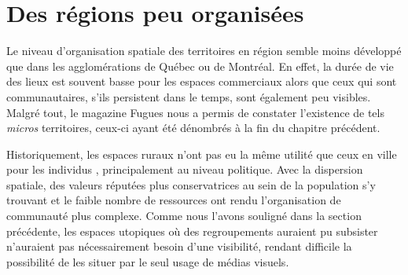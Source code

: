 \section{Des régions peu organisées}
\label{sec:des_regions_peu_organisees}
Le niveau d'organisation spatiale des territoires en région semble moins développé que dans les agglomérations de Québec ou de Montréal.
En effet, la durée de vie des lieux est souvent basse pour les espaces commerciaux alors que ceux qui sont communautaires, s'ils persistent dans le temps, sont également peu visibles.
Malgré tout, le magazine Fugues nous a permis de constater l'existence de tels \emph{micros} territoires, ceux-ci ayant été dénombrés à la fin du chapitre précédent.

Historiquement, les espaces ruraux n'ont pas eu la même utilité que ceux en ville pour les individus \lgbt{}, principalement au niveau politique.
Avec la dispersion spatiale, des valeurs réputées plus conservatrices au sein de la population s'y trouvant et le faible nombre de ressources ont rendu l'organisation de communauté \lgbt{} plus complexe.
Comme nous l'avons souligné dans la section précédente, les espaces utopiques où des regroupements \lgbt{} auraient pu subsister n'auraient pas nécessairement besoin d'une visibilité, rendant difficile la possibilité de les situer par le seul usage de médias visuels.



